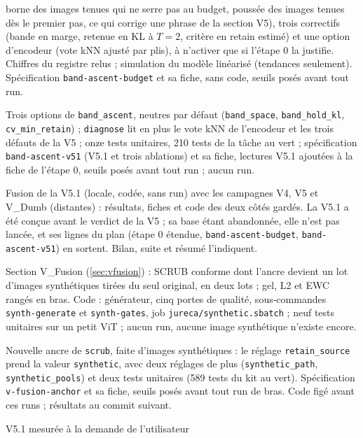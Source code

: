 \documentclass[11pt,a4paper]{article}
\newcommand{\code}[1]{\texttt{#1}}
\newcommand{\chemin}[1]{\nolinkurl{#1}}%
\begin{document}
\begin{description}[leftmargin=1.2em,font=\sffamily\bfseries\color{bleu}]
    borne des images tenues qui ne serre pas au budget, poussée des images tenues dès le premier
    pas, ce qui corrige une phrase de la section V5), trois correctifs (bande en marge, retenue en KL
    à $T=2$, critère en retain estimé) et une option d'encodeur (vote kNN ajusté par plis), à n'activer
    que si l'étape 0 la justifie. Chiffres du registre relus ; simulation du modèle linéarisé
    (tendances seulement). Spécification \code{band-ascent-budget} et sa fiche, sans code, seuils
    posés avant tout run.
  \item[22 novembre 2026, V5.1 codée] Trois options de \code{band\_ascent}, neutres par défaut
    (\code{band\_space}, \code{band\_hold\_kl}, \code{cv\_min\_retain}) ; \code{diagnose} lit en
    plus le vote kNN de l'encodeur et les trois défauts de la V5 ; onze tests unitaires, 210 tests de
    la tâche au vert ; spécification \code{band-ascent-v51} (V5.1 et trois ablations) et sa fiche,
    lectures V5.1 ajoutées à la fiche de l'étape 0, seuils posés avant tout run ; aucun run.
  \item[22 novembre 2026, sixième fusion] Fusion de la V5.1 (locale, codée, sans run) avec les
    campagnes V4, V5 et V\_Dumb (distantes) : résultats, fiches et code des deux côtés gardés. La
    V5.1 a été conçue avant le verdict de la V5 ; sa base étant abandonnée, elle n'est pas lancée,
    et ses lignes du plan (étape 0 étendue, \code{band-ascent-budget}, \code{band-ascent-v51}) en
    sortent. Bilan, suite et résumé l'indiquent.
  \item[22 novembre 2026, V\_Fusion] Section V\_Fusion (\cref{sec:vfusion}) : SCRUB conforme dont
    l'ancre devient un lot d'images synthétiques tirées du seul original, en deux lots ; gel, L2
    et EWC rangés en bras. Code : générateur, cinq portes de qualité, sous-commandes
    \code{synth-generate} et \code{synth-gates}, job \chemin{jureca/synthetic.sbatch} ; neuf tests
    unitaires sur un petit ViT ; aucun run, aucune image synthétique n'existe encore.
  \item[22 novembre 2026, ancre V\_Fusion] Nouvelle ancre de \code{scrub}, faite d'images
    synthétiques : le réglage \code{retain\_source} prend la valeur \code{synthetic}, avec deux
    réglages de plus (\code{synthetic\_path}, \code{synthetic\_pools}) et deux tests unitaires
    (589 tests du kit au vert). Spécification
    \code{v-fusion-anchor} et sa fiche, seuils posés avant tout run de bras. Code figé avant ces
    runs ; résultats au commit suivant.
  \item[22 novembre 2026, campagnes V5.1 et V\_Fusion] V5.1 mesurée à la demande de l'utilisateur

\end{description}
\end{document}
